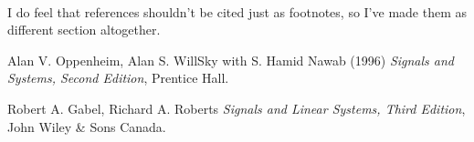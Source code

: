 \documentclass{article}
\begin{document}
\paragraph{}
I do feel that references shouldn't be cited just as footnotes, so I've made them as different section altogether.

\begin{thebibliography}{9}
	Alan V. Oppenheim, Alan S. WillSky with S. Hamid Nawab (1996) \emph{Signals and Systems, Second Edition}, Prentice Hall.

	Robert A. Gabel, Richard A. Roberts \emph{Signals and Linear Systems, Third Edition}, John Wiley \& Sons Canada.
\end{thebibliography}
\end{document}
